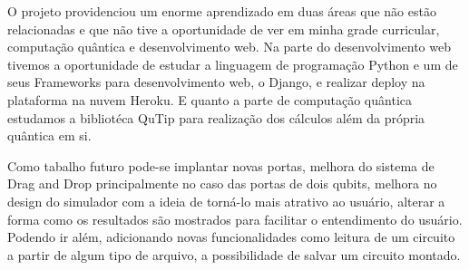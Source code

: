 \documentclass[a4paper, 12pt, oneside]{book}
\begin{document}
O projeto providenciou um enorme aprendizado em duas áreas que não estão relacionadas e que não tive a oportunidade de ver em minha grade curricular, computação quântica e desenvolvimento web. Na parte do desenvolvimento web tivemos a oportunidade de estudar a linguagem de programação Python e um de seus Frameworks para desenvolvimento web, o Django, e realizar deploy na plataforma na nuvem Heroku. E quanto a parte de computação quântica estudamos a bibliotéca QuTip para realização dos cálculos além da própria quântica em si. 

Como tabalho futuro pode-se implantar novas portas, melhora do sistema de Drag and Drop principalmente no caso das portas de dois qubits, melhora no design do simulador com a ideia de torná-lo mais atrativo ao usuário, alterar a forma como os resultados são mostrados para facilitar o entendimento do usuário. Podendo ir além, adicionando novas funcionalidades como leitura de um circuito a partir de algum tipo de arquivo, a possibilidade de salvar um circuito montado.



\end{document}
